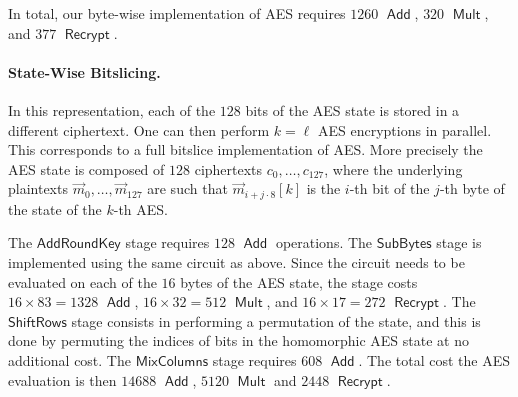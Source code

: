 \documentclass[11pt]{llncs}
\DeclareMathOperator{\Recrypt}{\ensuremath{\mathsf{Recrypt}}}
\DeclareMathOperator{\Add}{\ensuremath{\mathsf{Add}}}
\DeclareMathOperator{\Mult}{\ensuremath{\mathsf{Mult}}}
\newcommand*\AddRoundKey{\ensuremath{\mathsf{AddRoundKey}}}
\newcommand*\ShiftRows{\ensuremath{\mathsf{ShiftRows}}}
\newcommand*\SubBytes{\ensuremath{\mathsf{SubBytes}}}
\newcommand*\MixColumns{\ensuremath{\mathsf{MixColumns}}}
\begin{document}
In total, our byte-wise implementation of AES requires  $1260$ $\Add$,
 $320$ $\Mult$, and $377$ $\Recrypt$.

\paragraph{State-Wise Bitslicing.} In this representation, each of the
$128$ bits of the AES state is stored in a different ciphertext. One
can then perform $k=\ell$ AES encryptions in parallel. This
corresponds to a full bitslice implementation of AES.
More precisely
the AES state is composed of $128$ ciphertexts $c_0,\ldots,c_{127}$,
where the underlying plaintexts $\vec m_0,\ldots,\vec m_{127}$ are
such that $\vec m_{i+j\cdot 8}[k]$ is the $i$-th bit of the $j$-th
byte of the state of the $k$-th AES.

The $\AddRoundKey$ stage requires $128$ $\Add$ operations. The
$\SubBytes$ stage is implemented using the same circuit as
above. Since the circuit needs to be evaluated on each of the $16$
bytes of the AES state,  the stage costs 
$16\times83=1328$ $\Add$, $16\times32 = 512$
$\Mult$, and $16\times17=272$ $\Recrypt$. The $\ShiftRows$ stage consists in
performing a permutation of the state, and this is done by permuting
the indices of bits in the homomorphic AES state at no additional
cost. The 
$\MixColumns$ stage 
requires  $608$ $\Add$. The total cost the AES evaluation is then $14688$
$\Add$,  $5120$
$\Mult$ and $2448$ $\Recrypt$. 
\end{document}
